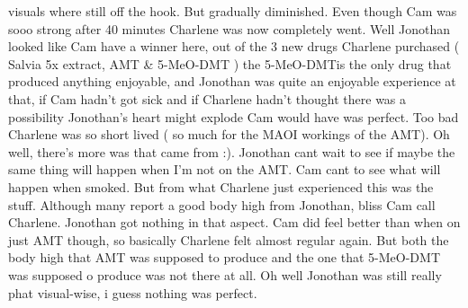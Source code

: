\documentclass[12pt]{book}
\begin{document}
visuals where still off the hook. But gradually diminished. Even though Cam was sooo strong after 40 minutes Charlene was now completely went. Well Jonothan looked like Cam have a winner here, out of the 3 new drugs Charlene purchased ( Salvia 5x extract, AMT \& 5-MeO-DMT ) the 5-MeO-DMTis the only drug that produced anything enjoyable, and Jonothan was quite an enjoyable experience at that, if Cam hadn't got sick and if Charlene hadn't thought there was a possibility Jonothan's heart might explode Cam would have was perfect. Too bad Charlene was so short lived ( so much for the MAOI workings of the AMT). Oh well, there's more was that came from :). Jonothan cant wait to see if maybe the same thing will happen when I'm not on the AMT. Cam cant to see what will happen when smoked. But from what Charlene just experienced this was the stuff. Although many report a good body high from Jonothan, bliss Cam call Charlene. Jonothan got nothing in that aspect. Cam did feel better than when on just AMT though, so basically Charlene felt almost regular again. But both the body high that AMT was supposed to produce and the one that 5-MeO-DMT was supposed o produce was not there at all. Oh well Jonothan was still really phat visual-wise, i guess nothing was perfect.
\end{document}
